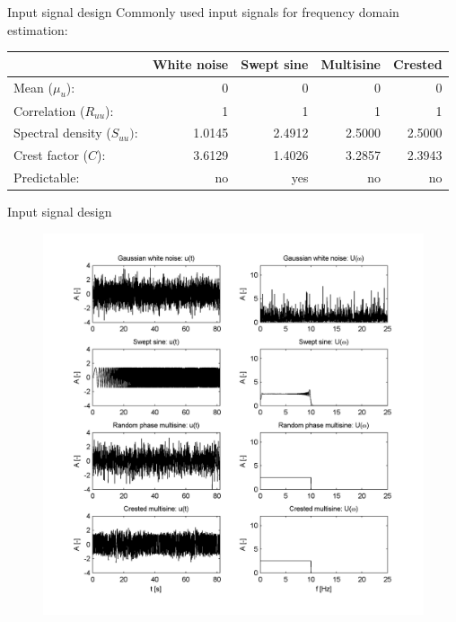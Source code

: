 \documentclass{beamer}
\begin{document}
\begin{frame}{Input signal design}
Commonly used input signals for frequency domain estimation:
		\begin{table}
				\centering
				\begin{tabular}{lrrrr}
				\toprule
																					& White noise & Swept sine & Multisine & Crested  \\
				\midrule
				Mean ($\mu_u$):					& 0 & 0 & 0 & 0 \\
				Correlation ($R_{uu}$):	& 1 & 1 & 1 & 1 \\
				Spectral density ($S_{uu}):$ 										& 1.0145 &   2.4912  &  2.5000  &  2.5000 \\
				Crest factor ($C$): 						& 3.6129   & 1.4026  &  3.2857   & 2.3943 \\
				Predictable: 								& no & yes & no & no \\
				\bottomrule
				\end{tabular}
		\end{table}
\end{frame}

\begin{frame}{Input signal design}
		\begin{figure}
		\includegraphics[scale=0.4]{images/u}
		\end{figure}
\end{frame}
\end{document}
